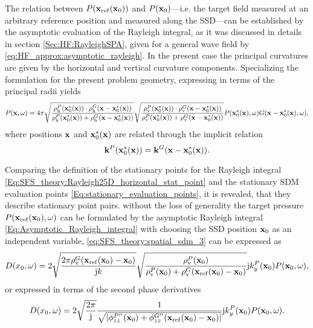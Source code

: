 The relation between $P(\mathbf{x}_{\mathrm{ref}}(\mathbf{x}_0))$ and $P(\mathbf{x}_0)$---i.e. the target field measured at an arbitrary reference position and measured along the SSD---can be established by the asymptotic evaluation of the Rayleigh integral, as it was discussed in details in section \ref{Sec:HF:RayleighSPA}, given for a general wave field by \eqref{eq:HF_approx:asymptotic_rayleigh}.
In the present case the principal curvatures are given by the horizontal and vertical curvature components.
Specializing the formulation for the present problem geometry, expressing in terms of the principal radii yields
\begin{equation}
\label{Eq:Asymptotic_Rayleigh_integral}
\footnotesize
P(\mathbf{x},\omega) = 4\pi
\sqrt{\frac{\rho_\mathrm{h}^P(\mathbf{x}_0^*(\mathbf{x})) \cdot \rho_\mathrm{h}^G(\mathbf{x}-\mathbf{x}_0^*(\mathbf{x}))}{\rho_\mathrm{h}^P(\mathbf{x}_0^*(\mathbf{x})) + \rho_\mathrm{h}^G(\mathbf{x}-\mathbf{x}_0^*(\mathbf{x}))}}
\sqrt{\frac{\rho_\mathrm{v}^P(\mathbf{x}_0^*(\mathbf{x})) \cdot \rho_\mathrm{v}^G(\mathbf{x}-\mathbf{x}_0^*(\mathbf{x}))}{\rho_\mathrm{v}^P(\mathbf{x}_0^*(\mathbf{x})) + \rho_\mathrm{v}^G(\mathbf{x}-\mathbf{x}_0^*(\mathbf{x}))}}
P(\mathbf{x}_0^*(\mathbf{x}),\omega) G(\mathbf{x}-\mathbf{x}_0^*(\mathbf{x}),\omega)
,
\end{equation} %
where positions $\mathbf{x}$ and $\mathbf{x}_0^*(\mathbf{x})$ are related through the implicit relation
\begin{equation}
\label{Eq:SFS_theory:Rayleigh25D_horizontal_stat_point}
\mathbf{k}^P(\mathbf{x}_0^*(\mathbf{x})) = \mathbf{k}^G( \mathbf{x} - \mathbf{x}_0^*(\mathbf{x})).
\end{equation}

Comparing the definition of the stationary points for the Rayleigh integral \eqref{Eq:SFS_theory:Rayleigh25D_horizontal_stat_point} and the stationary SDM evaluation points \eqref{Eq:stationary_evaluation_points}, it is revealed, that they describe stationary point pairs.
 without the loss of generality the target pressure $P(\mathbf{x}_{\mathrm{ref}}(\mathbf{x}_0),\omega)$ can be formulated by the asymptotic Rayleigh integral \eqref{Eq:Asymptotic_Rayleigh_integral} with choosing the SSD position $\mathbf{x}_0$ as an independent variable,  \eqref{eq:SFS_theory:spatial_sdm_3} can be expressed as 
\begin{equation}
D(x_0,\omega) =
\small
2\sqrt{\frac{2\pi  \rho_\mathrm{v}^G(\mathbf{x}_{\mathrm{ref}}(\mathbf{x}_0)-\mathbf{x}_0)}{\mathrm{j} k}} 
\sqrt{\frac{\rho_\mathrm{v}^P(\mathbf{x}_0) }{\rho_\mathrm{v}^P(\mathbf{x}_0) + \rho_\mathrm{v}^G(\mathbf{x}_{\mathrm{ref}}(\mathbf{x}_0)-\mathbf{x}_0)}}
\mathrm{j} k_y^{P}(\mathbf{x}_0)
P(\mathbf{x}_0,\omega),
\end{equation}
or expressed in terms of the second phase derivatives 
\begin{equation}
D(x_0,\omega) =
\small
2\sqrt{\frac{2\pi }{\mathrm{j} }} 
\frac{ 1 }{\sqrt{|\phi^{P''}_{zz}(\mathbf{x}_0) + \phi^{G''}_{zz}(\mathbf{x}_{\mathrm{ref}}(\mathbf{x}_0)-\mathbf{x}_0)|}}
\mathrm{j} k_y^{P}(\mathbf{x}_0)
P(\mathbf{x}_0,\omega).
\end{equation}

